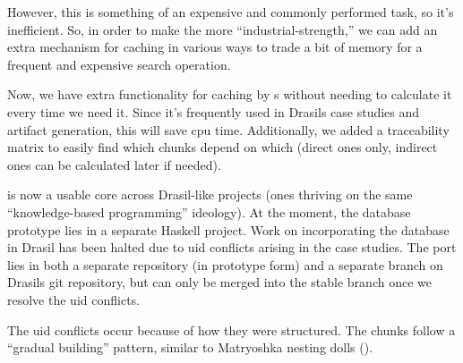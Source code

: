 However, this is something of an expensive and commonly performed task, so it's
inefficient. So, in order to make the \ChunkDB{} more ``industrial-strength,''
we can add an extra mechanism for caching in various ways to trade a bit of
memory for a frequent and expensive search operation.


Now, we have extra functionality for caching by \TypeRep{}s without needing to
calculate it every time we need it. Since it's frequently used in Drasils case
studies and artifact generation, this will save \acs{cpu} time. Additionally, we
added a traceability matrix to easily find which chunks depend on which (direct
ones only, indirect ones can be calculated later if needed).

\ChunkDB{} is now a usable core across Drasil-like projects (ones thriving on
the same ``knowledge-based programming'' ideology). At the moment, the database
prototype lies in a separate Haskell project. Work on incorporating the database
in Drasil has been halted due to \acs{uid} conflicts arising in the case
studies. The port lies in both a separate repository (in prototype form) and a
separate branch on Drasils git repository, but can only be merged into the
stable branch once we resolve the \acs{uid} conflicts.


\matryoshkaDollsImg{}

The \acs{uid} conflicts occur because of how they were structured. The chunks
follow a ``gradual building'' pattern, similar to Matryoshka nesting
dolls ().




